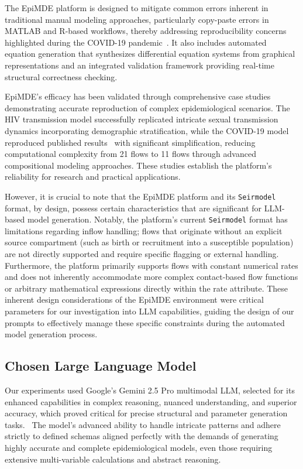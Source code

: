 \documentclass[conference]{IEEEtran}
\begin{document}
The EpiMDE platform is designed to mitigate common errors inherent in traditional manual modeling approaches, particularly copy-paste errors in MATLAB and R-based workflows, thereby addressing reproducibility concerns highlighted during the COVID-19 pandemic~\cite{b3}. It also includes automated equation generation that synthesizes differential equation systems from graphical representations and an integrated validation framework providing real-time structural correctness checking.

EpiMDE's efficacy has been validated through comprehensive case studies demonstrating accurate reproduction of complex epidemiological scenarios. The HIV transmission model successfully replicated intricate sexual transmission dynamics incorporating demographic stratification, while the COVID-19 model reproduced published results~\cite{b4} with significant simplification, reducing computational complexity from 21 flows to 11 flows through advanced compositional modeling approaches. These studies establish the platform's reliability for research and practical applications.

However, it is crucial to note that the EpiMDE platform and its \texttt{Seirmodel} format, by design, possess certain characteristics that are significant for LLM-based model generation. Notably, the platform's current \texttt{Seirmodel} format has limitations regarding inflow handling; flows that originate without an explicit source compartment (such as birth or recruitment into a susceptible population) are not directly supported and require specific flagging or external handling. Furthermore, the platform primarily supports flows with constant numerical rates and does not inherently accommodate more complex contact-based flow functions or arbitrary mathematical expressions directly within the rate attribute. These inherent design considerations of the EpiMDE environment were critical parameters for our investigation into LLM capabilities, guiding the design of our prompts to effectively manage these specific constraints during the automated model generation process.

\subsection{Chosen Large Language Model}
Our experiments used Google's Gemini 2.5 Pro multimodal LLM, selected for its enhanced capabilities in complex reasoning, nuanced understanding, and superior accuracy, which proved critical for precise structural and parameter generation tasks.~\cite{b5} The model's advanced ability to handle intricate patterns and adhere strictly to defined schemas aligned perfectly with the demands of generating highly accurate and complete epidemiological models, even those requiring extensive multi-variable calculations and abstract reasoning.
\end{document}
